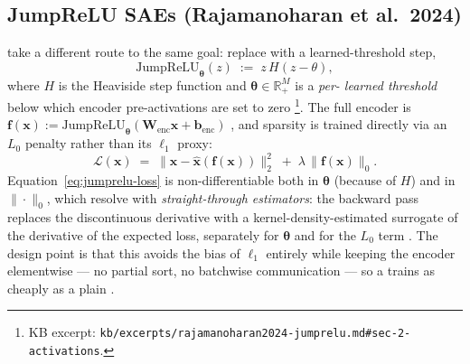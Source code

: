 \subsection{JumpReLU SAEs (Rajamanoharan et al.\ 2024)}
\label{sec:sae-jumprelu}

\citet{rajamanoharan2024-jumprelu} take a different route to the same
goal: replace  with a learned-threshold step,
\begin{equation}
  \mathrm{JumpReLU}_{\boldsymbol{\theta}}(z) \;:=\; z\,H(z - \theta),
  \label{eq:jumprelu}
\end{equation}
where $H$ is the Heaviside step function and
$\boldsymbol{\theta} \in \mathbb{R}^M_+$ is a \emph{per- learned
threshold} below which encoder pre-activations are set to zero
\citep[\S 2, Eq.~4]{rajamanoharan2024-jumprelu}\footnote{KB excerpt:
\nolinkurl{kb/excerpts/rajamanoharan2024-jumprelu.md#sec-2-activations}.}.
The full  encoder is
$\mathbf{f}(\mathbf{x}) := \mathrm{JumpReLU}_{\boldsymbol{\theta}}(\mathbf{W}_{\text{enc}}\mathbf{x} + \mathbf{b}_{\text{enc}})$
\citep[\S 3, Eq.~8]{rajamanoharan2024-jumprelu}, and sparsity is
trained directly via an $L_0$ penalty rather than its $\ell_1$ proxy:
\begin{equation}
  \mathcal{L}(\mathbf{x})
  \;=\;
  \|\mathbf{x} - \hat{\mathbf{x}}(\mathbf{f}(\mathbf{x}))\|_2^2
  \;+\;
  \lambda\,\|\mathbf{f}(\mathbf{x})\|_0.
  \label{eq:jumprelu-loss}
\end{equation}
Equation~\eqref{eq:jumprelu-loss} is non-differentiable both in
$\boldsymbol{\theta}$ (because of $H$) and in $\|\cdot\|_0$, which
\citet{rajamanoharan2024-jumprelu} resolve with
\emph{straight-through estimators}: the backward pass replaces the
discontinuous derivative with a kernel-density-estimated surrogate of
the derivative of the expected loss, separately for $\boldsymbol{\theta}$
and for the $L_0$ term \citep[\S 3]{rajamanoharan2024-jumprelu}. The
 design point is that this avoids the  bias of $\ell_1$
entirely while keeping the encoder elementwise --- no partial sort, no
batchwise communication --- so a  trains as cheaply as a
plain  .

